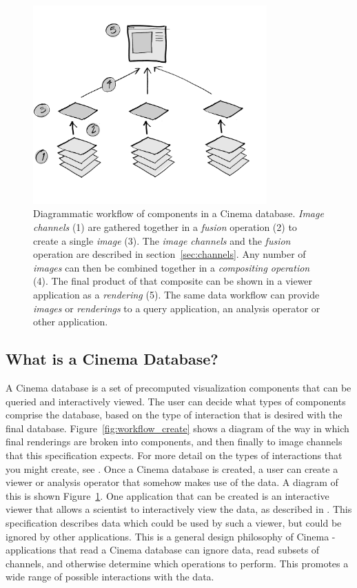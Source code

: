 \begin{figure}[h!]
\centering
\includegraphics[width=0.8\textwidth]{img/image_pipeline_numbers_fill}
\caption{
    Diagrammatic workflow of components in a Cinema database. \textit{Image channels} (1) are gathered together in a \textit{fusion} operation (2) to create a single \textit{image} (3). The \textit{image channels} and the \textit{fusion} operation are described in section~\ref{sec:channels}. Any number of \textit{images} can then be combined together in a \textit{compositing operation} (4). The final product of that composite can be shown in a viewer application as a \textit{rendering} (5). The same data workflow can provide \textit{images} or \textit{renderings} to a query application, an analysis operator or other application.
}
\label{fig:workflow}
\end{figure}

\subsection{What is a Cinema Database?}
A Cinema database is a set of precomputed visualization components that can be queried and interactively viewed. The user can decide what types of components comprise the database, based on the type of interaction that is desired with the final database.  Figure~\ref{fig:workflow_create} shows a diagram of the way in which final renderings are broken into components, and then finally to image channels that this specification expects. For more detail on the types of interactions that you might create, see \cite{cinemaSC14}. Once a Cinema database is created, a user can create a viewer or analysis operator that somehow makes use of the data. A diagram of this is shown Figure~\ref{fig:workflow}. One application that can be created is an interactive viewer that allows a scientist to interactively view the data, as described in \cite{cinemaSC14}. This specification describes data which could be used by such a viewer, but could be ignored by other applications. This is a general design philosophy of Cinema - applications that read a Cinema database can ignore data, read subsets of channels, and otherwise determine which operations to perform. This promotes a wide range of possible interactions with the data.

